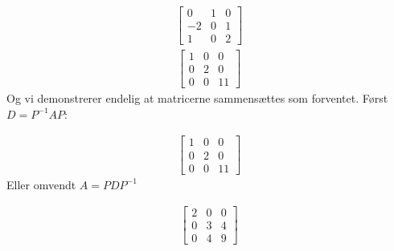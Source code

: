 \documentclass[letterpaper,10pt,english]{jupyterBook}
\begin{document}
\begin{sphinxVerbatim}[commandchars=\\\{\}]
   
 
\end{sphinxVerbatim}
\begin{equation*}
\begin{split}\displaystyle \left[\begin{matrix}0 & 1 & 0\\-2 & 0 & 1\\1 & 0 & 2\end{matrix}\right]\end{split}
\end{equation*}\begin{equation*}
\begin{split}\displaystyle \left[\begin{matrix}1 & 0 & 0\\0 & 2 & 0\\0 & 0 & 11\end{matrix}\right]\end{split}
\end{equation*}
Og vi demonstrerer endelig at matricerne sammensættes som forventet. Først \(D = P^{-1}AP\):

\begin{sphinxVerbatim}[commandchars=\\\{\}]
    
\end{sphinxVerbatim}
\begin{equation*}
\begin{split}\displaystyle \left[\begin{matrix}1 & 0 & 0\\0 & 2 & 0\\0 & 0 & 11\end{matrix}\right]\end{split}
\end{equation*}
Eller omvendt \(A = P D P^{-1}\)

\begin{sphinxVerbatim}[commandchars=\\\{\}]
    
\end{sphinxVerbatim}
\begin{equation*}
\begin{split}\displaystyle \left[\begin{matrix}2 & 0 & 0\\0 & 3 & 4\\0 & 4 & 9\end{matrix}\right]\end{split}
\end{equation*}
\end{document}

